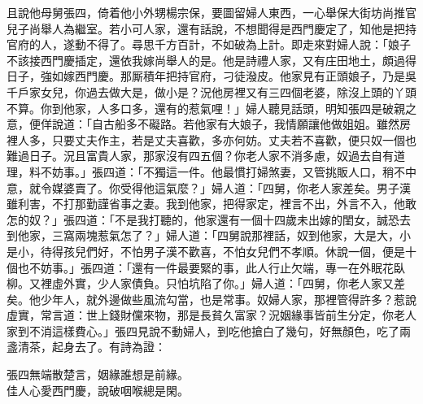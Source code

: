 且說他母舅張四，倚着他小外甥楊宗保，要圖留婦人東西，一心舉保大街坊尚推官兒子尚舉人為繼室。若小可人家，還有話說，不想聞得是西門慶定了，知他是把持官府的人，遂動不得了。尋思千方百計，不如破為上計。即走來對婦人說：「娘子不該接西門慶插定，還依我嫁尚舉人的是。他是詩禮人家，又有庄田地土，頗過得日子，強如嫁西門慶。那厮積年把持官府，刁徒潑皮。{}他家見有正頭娘子，乃是吳千戶家女兒，你過去做大是，做小是？況他房裡又有三四個老婆，除沒上頭的丫頭不算。你到他家，人多口多，還有的惹氣哩！」婦人聽見話頭，明知張四是破親之意，{}便佯說道：「自古船多不礙路。若他家有大娘子，我情願讓他做姐姐。雖然房裡人多，只要丈夫作主，若是丈夫喜歡，多亦何妨。丈夫若不喜歡，便只奴一個也難過日子。況且富貴人家，那家沒有四五個？你老人家不消多慮，奴過去自有道理，料不妨事。」張四道：「不獨這一件。他最慣打婦煞妻，又管挑販人口，稍不中意，就令媒婆賣了。{}你受得他這氣麼？」婦人道：「四舅，你老人家差矣。男子漢雖利害，不打那勤謹省事之妻。我到他家，把得家定，裡言不出，外言不入，他敢怎的奴？」張四道：「不是我打聽的，他家還有一個十四歲未出嫁的閨女，誠恐去到他家，三窩兩塊惹氣怎了？」{}婦人道：「四舅說那裡話，奴到他家，大是大，小是小，待得孩兒們好，不怕男子漢不歡喜，不怕女兒們不孝順。休說一個，便是十個也不妨事。」張四道：「還有一件最要緊的事，此人行止欠端，專一在外眠花臥柳。又裡虛外實，少人家債負。只怕坑陷了你。」婦人道：「四舅，你老人家又差矣。他少年人，就外邊做些風流勾當，也是常事。奴婦人家，那裡管得許多？{}惹說虛實，常言道：世上錢財儻來物，那是長貧久富家？況姻緣事皆前生分定，你老人家到不消這樣費心。」張四見說不動婦人，到吃他搶白了幾句，好無顏色，吃了兩盞清茶，{}起身去了。有詩為證：

\begin{myquote} 
張四無端散楚言，姻緣誰想是前緣。\\佳人心愛西門慶，說破咽喉總是閑。
\end{myquote} 

